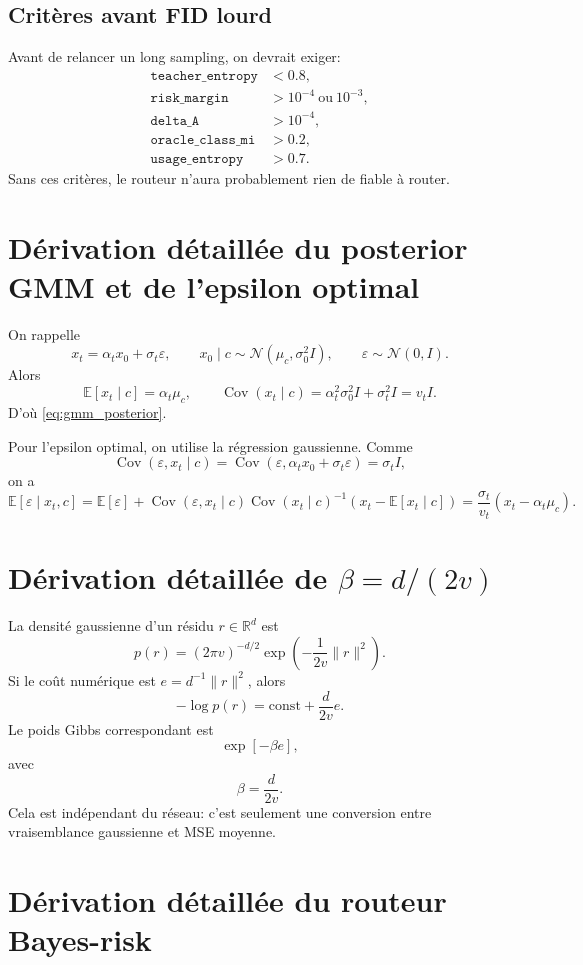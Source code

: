 \documentclass[11pt,a4paper]{article}
\newcommand{\E}{\mathbb{E}}
\newcommand{\R}{\mathbb{R}}
\newcommand{\Cov}{\operatorname{Cov}}
\newcommand{\1}{\mathbf{1}}
\newcommand{\eps}{\varepsilon}
\newcommand{\xt}{x_t}
\newcommand{\xzero}{x_0}
\begin{document}
\subsection{Critères avant FID lourd}

Avant de relancer un long sampling, on devrait exiger:
\begin{align}
\texttt{teacher\_entropy} &<0.8,\\
\texttt{risk\_margin} &>10^{-4}\ \text{ou}\ 10^{-3},\\
\texttt{delta\_A} &>10^{-4},\\
\texttt{oracle\_class\_mi} &>0.2,\\
\texttt{usage\_entropy} &>0.7.
\end{align}
Sans ces critères, le routeur n'aura probablement rien de fiable à router.

\appendix
\section{Dérivation détaillée du posterior GMM et de l'epsilon optimal}

On rappelle
\[
\xt=\alpha_t\xzero+\sigma_t\eps,
\qquad
\xzero\mid c\sim\mathcal N(\mu_c,\sigma_0^2I),
\qquad
\eps\sim\mathcal N(0,I).
\]
Alors
\[
\E[\xt\mid c]=\alpha_t\mu_c,
\qquad
\Cov(\xt\mid c)=\alpha_t^2\sigma_0^2I+\sigma_t^2I=v_tI.
\]
D'où \eqref{eq:gmm_posterior}.

Pour l'epsilon optimal, on utilise la régression gaussienne. Comme
\[
\Cov(\eps,\xt\mid c)=\Cov(\eps,\alpha_t\xzero+\sigma_t\eps)=\sigma_t I,
\]
on a
\[
\E[\eps\mid\xt,c]
=\E[\eps]+\Cov(\eps,\xt\mid c)\Cov(\xt\mid c)^{-1}(\xt-
\E[\xt\mid c])
=\frac{\sigma_t}{v_t}(\xt-\alpha_t\mu_c).
\]

\section{Dérivation détaillée de $\beta=d/(2v)$}

La densité gaussienne d'un résidu $r\in\R^d$ est
\[
p(r)=(2\pi v)^{-d/2}\exp\left(-\frac{1}{2v}\|r\|^2\right).
\]
Si le coût numérique est $e=d^{-1}\|r\|^2$, alors
\[
-\log p(r)=\mathrm{const}+\frac{d}{2v}e.
\]
Le poids Gibbs correspondant est
\[
\exp[-\beta e],
\]
avec
\[
\beta=\frac d{2v}.
\]
Cela est indépendant du réseau: c'est seulement une conversion entre vraisemblance gaussienne et MSE moyenne.

\section{Dérivation détaillée du routeur Bayes-risk}
\end{document}
